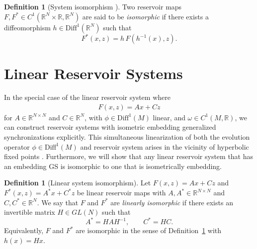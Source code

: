 \documentclass{article}
\theoremstyle{definition}
\newtheorem{defn}[theorem]{Definition}
\theoremstyle{definition}
\numberwithin{theorem}{section}
\begin{document}
\begin{defn}[System isomorphism \cite{Tsuda1992} \cite{GrigoryevaOrtega2021} \cite{Grigoryeva2023}]
\label{def:system_isomorphism}
Two reservoir maps $F, F^* \in C^1(\mathbb{R}^N \times \mathbb{R},\mathbb{R}^N)$ are said to be 
\emph{isomorphic} if there exists a diffeomorphism $h \in \text{Diff}^1(\mathbb{R}^N)$ such that
\[
    F^*(x,z) = h \, F(h^{-1}(x),z).
\]
\end{defn}

\section{Linear Reservoir Systems}

In the special case of the linear reservoir system where
\begin{align*}
    F(x,z) = Ax + Cz
\end{align*}
for $A \in \mathbb{R}^{N\times N}$ and $C \in \mathbb{R}^N$, with $\phi \in \text{Diff}^1(M)$ linear, and $\omega \in C^1(M,\mathbb{R})$, we can construct reservoir systems with isometric embedding generalized synchronizations explicitly. This simultaneous linearization of both the evolution operator $\phi \in \text{Diff}^1(M)$ and reservoir system arises in the vicinity of hyperbolic fixed points \cite{Hartman1960} \cite{Grobman1959}. Furthermore, we will show that any linear reservoir system that has an embedding GS is isomorphic to one that is isometrically embedding.

\begin{defn}[Linear system isomorphism]
\label{def:linear_system_isomorphism}
Let $F(x,z) = Ax + Cz$ and $F^*(x,z) = A^*x + C^* z$ be linear reservoir maps with 
$A,A^* \in \mathbb{R}^{N \times N}$ and $C,C^* \in \mathbb{R}^N$. 
We say that $F$ and $F^*$ are \emph{linearly isomorphic} if there exists an invertible 
matrix $H \in GL(N)$ such that
\[
    A^* = H A H^{-1}, 
    \qquad 
    C^* = H C.
\]
Equivalently, $F$ and $F^*$ are isomorphic in the sense of 
Definition~\ref{def:system_isomorphism} with $h(x)=Hx$.
\end{defn}
\end{document}
